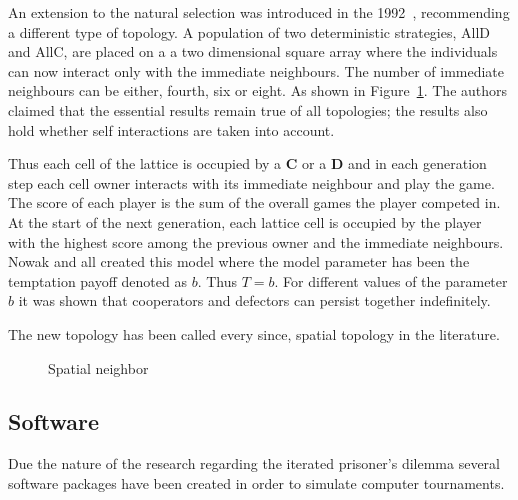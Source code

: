 \documentclass{article}
\begin{document}
An extension to the natural selection was introduced in the 1992~\cite{Nowak1992},
recommending a different type of topology. A population of two deterministic
strategies, AllD and AllC, are placed on a a two dimensional square array
where the individuals can now interact only with the immediate neighbours.
The number of immediate neighbours can be either, fourth, six or eight. As
shown in Figure~\ref{fig:topologies}. The authors claimed that the essential
results remain true of all topologies; the results also hold whether self interactions
are taken into account.

Thus each cell of the lattice is occupied by a \textbf{C} or a \textbf{D} and in
each generation step each cell owner interacts with its immediate neighbour and
play the game. The score of each player is the sum of the overall games the player
competed in. At the start of the next generation, each lattice cell is occupied by the
player with the highest score among the previous owner and the immediate
neighbours. Nowak and all created this model  where the model parameter
has been the temptation payoff denoted as \(b\). Thus \(T=b\). For 
different values of the parameter \(b\) it was shown that cooperators and
defectors can persist together indefinitely. 

The new topology has been called every since, spatial topology in the 
literature. %

\begin{figure}[!hbtp]
\centering
    \begin{subfigure}{.25\textwidth}
            
    \end{subfigure}
    \begin{subfigure}{.25\textwidth}\centering
         
     \end{subfigure}
     \begin{subfigure}{.25\textwidth}\centering
         
     \end{subfigure}
     \caption{Spatial neighbor}
     \label{fig:topologies}
\end{figure}

\subsection{Software} 

Due the nature of the research regarding the iterated prisoner's dilemma
several software packages have been created in order to simulate computer
tournaments.
\end{document}
